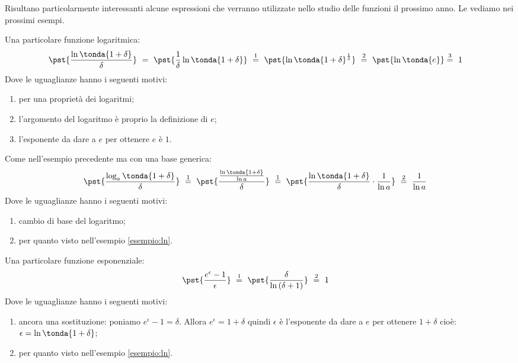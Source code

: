 Risultano particolarmente interessanti alcune espressioni che verranno 
utilizzate nello studio delle funzioni il prossimo anno.
Le vediamo nei prossimi esempi.

\begin{esempio}
\label{esempio:ln}
Una particolare funzione logaritmica:
\begin{align*}
 &\pst{\dfrac{\ln\tonda{1+\delta}}{\delta}}~ = ~  
 \pst{\frac{1}{\delta}\ln\tonda{1+\delta}} ~\stackrel{1}{=} ~
 \pst{\ln\tonda{1+\delta}^\frac{1}{\delta}}
~ \stackrel{2}{=} ~
\pst{\ln\tonda{e}} \stackrel{3}{=} ~ 1
\end{align*}
Dove le uguaglianze hanno i seguenti motivi:
\begin{enumerate} [nosep]
 \item per una proprietà dei logaritmi;
 \item l'argomento del logaritmo è proprio la definizione di \(e\);
 \item l'esponente da dare a \(e\) per ottenere \(e\) è \(1\).
\end{enumerate}
\end{esempio}

\begin{esempio}
\label{esempio:log_a}
Come nell'esempio precedente ma con una base generica:
\begin{align*}
 &\pst{\dfrac{\log_a\tonda{1+\delta}}{\delta}}~\stackrel{1}{=} ~  
 \pst{\dfrac{\frac{\ln\tonda{1+\delta}}{\ln a}}{\delta}}~\stackrel{1}{=} ~
 \pst{\dfrac{\ln\tonda{1+\delta}}{\delta}\cdot \dfrac{1}{\ln a}}
 ~ \stackrel{2}{=} ~
 \dfrac{1}{\ln a}
\end{align*}
Dove le uguaglianze hanno i seguenti motivi:
\begin{enumerate} [nosep]
 \item cambio di base del logaritmo;
 \item per quanto visto nell'esempio \ref{esempio:ln}.
\end{enumerate}
\end{esempio}


\begin{esempio}
Una particolare funzione esponenziale:
\begin{align*}
&\pst{\dfrac{e^\epsilon-1}{\epsilon}}
~ \stackrel{1}{=} ~  
\pst{\dfrac{\delta}{\ln{(\delta+1)}}}~ \stackrel{2}{=} ~ 1
\end{align*}
Dove le uguaglianze hanno i seguenti motivi:
\begin{enumerate} [nosep]
 \item ancora una sostituzione: poniamo \(e^\epsilon-1=\delta\). 
Allora \(e^\epsilon = 1+\delta\) quindi \(\epsilon\) è l'esponente da dare 
a \(e\) per ottenere \(1+\delta\) cioè: 
\(\epsilon = \ln{\tonda{1+\delta}}\);
 \item per quanto visto nell'esempio \ref{esempio:ln}.
\end{enumerate}
\end{esempio}

